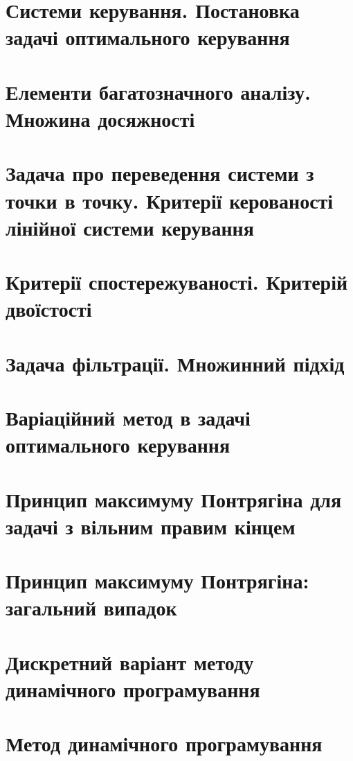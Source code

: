 \documentclass[a5paper, 10pt]{article}
\theoremstyle{definition}
\numberwithin{equation}{section}
\begin{document}
\section{Системи керування. Постановка задачі оптимального керування}

 \newpage

\section{Елементи багатозначного аналізу. Множина досяжності}

 \newpage

\section{Задача про переведення системи з точки в точку. Критерії керованості лінійної системи керування}

 \newpage

\section{Критерії спостережуваності. Критерій двоїстості}

 \newpage

\section{Задача фільтрації. Множинний підхід}

 \newpage

\section{Варіаційний метод в задачі оптимального керування}

 \newpage

\section{Принцип максимуму Понтрягіна для задачі з вільним правим кінцем}

 \newpage

\section{Принцип максимуму Понтрягіна: загальний випадок}

 \newpage

\section{Дискретний варіант методу динамічного програмування}

 \newpage

\section{Метод динамічного програмування}

 \newpage
\end{document}
